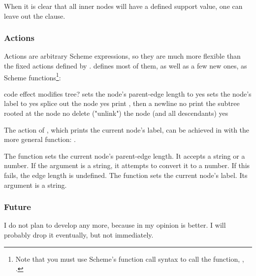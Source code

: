 When it is clear that all inner nodes will have a defined support
value, one can leave out the  clause.

\subsubsection{Actions}

Actions are arbitrary Scheme expressions, so they are much more flexible than
the fixed actions defined by \ed. \sched{} defines most of them, as well as a
few new ones, as Scheme functions\footnote{Note that you must use Scheme's function call syntax to call the function, \ie, .}:

\startalignment[center]
\starttabulate[|c|l|c|]
code \NC effect \NC modifies tree?\NC\NR
\HL
{}	\NC sets the node's parent-edge length to 	\NC yes \NC\NR
{}	\NC sets the node's label to 	\NC yes \NC\NR
{} 				\NC splice out the node 									\NC yes \NC\NR
{} 	\NC print , then a newline 		\NC no \NC\NR
{} 				\NC print the subtree rooted at the node 	\NC no \NC\NR
{} 				\NC delete ("unlink") the node (and all descendants) \NC yes \NC\NR
\stoptabulate
\stopalignment

The  action of \ed{}, which prints the current node's
label, can be achieved in \sched{} with the more general  function:
.

The  function sets the current node's parent-edge length. It accepts
a string or a number. If the argument is a string, it attempts to convert it to
a number. If this fails, the edge length is undefined. The 
function sets the current node's label. Its argument is a string.

\subsubsection{Future}

I do not plan to develop \sched{} any more, because in my opinion \luaed{} is
better. I will probably drop it eventually, but not immediately.
